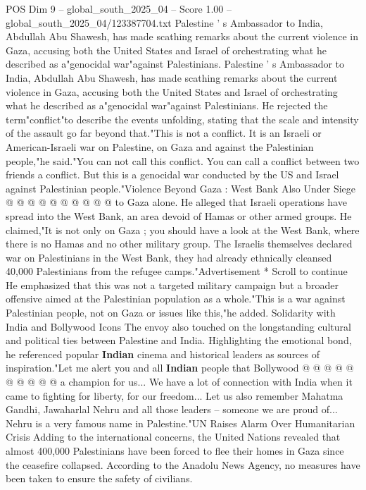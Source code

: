 \begin{textsample}{POS Dim 9 – global\_south\_2025\_04 – Score 1.00 – global\_south\_2025\_04/123387704.txt}  \label{ex:f9_pos_154}
Palestine ' s Ambassador to India, Abdullah Abu Shawesh, has made scathing remarks about the current violence in Gaza, accusing both the United States and Israel of orchestrating what he described as a"genocidal war"against Palestinians.
Palestine ' s Ambassador to India, Abdullah Abu Shawesh, has made scathing remarks about the current violence in Gaza, accusing both the United States and Israel of orchestrating what he described as a"genocidal war"against Palestinians.
He rejected the term"conflict"to describe the events unfolding, stating that the scale and intensity of the assault go far beyond that."This is not a conflict.
It is an Israeli or American-Israeli war on Palestine, on Gaza and against the Palestinian people,"he said."You can not call this conflict.
You can call a conflict between two friends a conflict.
But this is a genocidal war conducted by the US and Israel against Palestinian people."Violence Beyond Gaza : West Bank Also Under Siege @ @ @ @ @ @ @ @ @ @ to Gaza alone.
He alleged that Israeli operations have spread into the West Bank, an area devoid of Hamas or other armed groups.
He claimed,"It is not only on Gaza ; you should have a look at the West Bank, where there is no Hamas and no other military group.
The Israelis themselves declared war on Palestinians in the West Bank, they had already ethnically cleansed 40,000 Palestinians from the refugee camps."Advertisement * Scroll to continue He emphasized that this was not a targeted military campaign but a broader offensive aimed at the Palestinian population as a whole."This is a war against Palestinian people, not on Gaza or issues like this,"he added.
Solidarity with India and Bollywood Icons The envoy also touched on the longstanding cultural and political ties between Palestine and India.
Highlighting the emotional bond, he referenced popular \textbf{Indian} cinema and historical leaders as sources of inspiration."Let me alert you and all \textbf{Indian} people that Bollywood @ @ @ @ @ @ @ @ @ @ a champion for us...
We have a lot of connection with India when it came to fighting for liberty, for our freedom...
Let us also remember Mahatma Gandhi, Jawaharlal Nehru and all those leaders -- someone we are proud of...
Nehru is a very famous name in Palestine."UN Raises Alarm Over Humanitarian Crisis Adding to the international concerns, the United Nations revealed that almost 400,000 Palestinians have been forced to flee their homes in Gaza since the ceasefire collapsed.
According to the Anadolu News Agency, no measures have been taken to ensure the safety of civilians.

\end{textsample}
